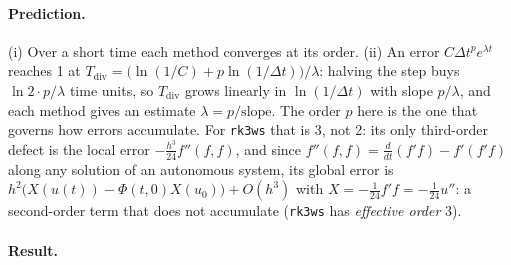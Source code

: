 \documentclass[11pt,a4paper]{article}
\begin{document}
\paragraph{Prediction.} (i) Over a short time each method converges at its
order. (ii) An error $C\Delta t^p e^{\lambda t}$ reaches 1 at
$T_{\mathrm{div}} = \bigl(\ln(1/C) + p\ln(1/\Delta t)\bigr)/\lambda$: halving
the step buys $\ln 2 \cdot p/\lambda$ time units, so $T_{\mathrm{div}}$ grows
linearly in $\ln(1/\Delta t)$ with slope $p/\lambda$, and each method gives
an estimate $\lambda = p/\text{slope}$. The order $p$ here is the one that
governs how errors accumulate. For \texttt{rk3ws} that is 3, not 2: its only
third-order defect is the local error $-\tfrac{h^3}{24}f''(f,f)$, and since
$f''(f,f) = \tfrac{d}{dt}(f'f) - f'(f'f)$ along any solution of an autonomous
system, its global error is $h^2\bigl(X(u(t)) - \Phi(t,0)X(u_0)\bigr) +
O(h^3)$ with $X = -\tfrac1{24}f'f = -\tfrac1{24}u''$: a second-order term
that does not accumulate (\texttt{rk3ws} has \emph{effective order} 3).

\paragraph{Result.}
\begin{center}
\small

\end{center}
\end{document}
